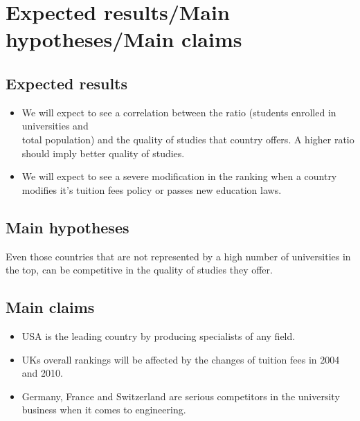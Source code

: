 \section{Expected results/Main hypotheses/Main claims}
\subsection{Expected results} 
\begin{itemize}
\item We will expect to see a correlation between the ratio (students enrolled in universities and \\total population) and the quality of studies that country offers. A higher ratio should imply better quality of studies.
\item We will expect to see a severe modification in the ranking when a country modifies it's tuition fees policy or passes new education laws.
\end{itemize}
\subsection{Main hypotheses}
Even those countries that are not represented by a high number of universities in the top, can be competitive in the quality of studies they offer. 
\subsection{Main claims}
\begin{itemize}
\item USA is the leading country by producing specialists of any field.
\item UKs overall rankings will be affected by the changes of tuition fees in 2004 and 2010.
\item Germany, France and Switzerland are serious competitors in the university business when it comes to engineering. 
\end{itemize}